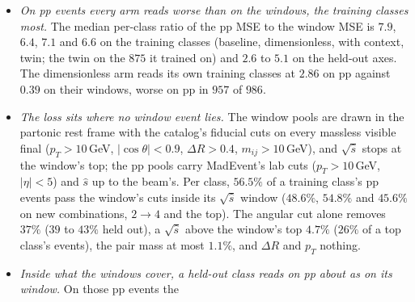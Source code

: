 \documentclass[11pt]{article}
\begin{document}
\begin{itemize}
  \item \emph{On pp events every arm reads worse than on the windows, the training classes most.} The median per-class
    ratio of the pp MSE to the window MSE is $7.9$, $6.4$, $7.1$ and $6.6$ on the training classes (baseline,
    dimensionless, with context, twin; the twin on the $875$ it trained on) and $2.6$ to $5.1$ on the held-out axes. The
    dimensionless arm reads its own training classes at $2.86$ on pp against $0.39$ on their windows, worse on pp in
    $957$ of $986$.
  \item \emph{The loss sits where no window event lies.} The window pools are drawn in the partonic rest frame with the
    catalog's fiducial cuts on every massless visible final ($p_T>10$\,GeV, $|\cos\theta|<0.9$, $\Delta R>0.4$,
    $m_{ij}>10$\,GeV), and $\sqrt{\hat s}$ stops at the window's top; the pp pools carry MadEvent's lab cuts
    ($p_T>10$\,GeV, $|\eta|<5$) and $\hat s$ up to the beam's. Per class, $56.5\%$ of a training class's pp events pass
    the window's cuts inside its $\sqrt{\hat s}$ window ($48.6\%$, $54.8\%$ and $45.6\%$ on new combinations, $2\to4$
    and the top). The angular cut alone removes $37\%$ ($39$ to $43\%$ held out), a $\sqrt{\hat s}$ above the window's
    top $4.7\%$ ($26\%$ of a top class's events), the pair mass at most $1.1\%$, and $\Delta R$ and $p_T$ nothing.
  \item \emph{Inside what the windows cover, a held-out class reads on pp about as on its window.} On those pp events the

\end{itemize}
\end{document}
